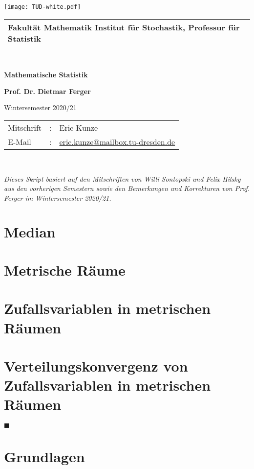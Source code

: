 \documentclass[ngerman, a4paper, 11pt]{report}
\makeatletter
\newcommand{\makeTUtitle}[1][]{%
    \begin{titlepage}
        \pagecolor{cddarkblue!90}
        \color{white}

        \raggedright
        \fosfamily
        \setlength{\parindent}{0pt}

        \hspace{-18.6mm} %
        \texttt{[image: TUD-white.pdf]} \\

        \vspace{3mm}
        \begin{tabular}{m{\textwidth}}
            \hline
            \hspace{-4pt}\small{\textbf{Fakultät Mathematik} Institut für Stochastik, Professur für Statistik} \\
            \hline
        \end{tabular} \\

        \vspace{5cm}
        {\Huge\bfseries \MakeUppercase Mathematische Statistik \par}
        \ifthenelse{\isempty{#1}}{}{
            \vspace{0.5cm}%
            {\Large \itshape #1} \\%
        }
        \vspace{1.5cm}
        \textbf{{\Large Prof. Dr. Dietmar Ferger}} \par
        \vspace{0.5cm}
        {\large Wintersemester 2020/21}

        \vfill
        \begin{tabular}{lll}
            Mitschrift  & : & Eric Kunze \\
            E-Mail      & : & \url{eric.kunze@mailbox.tu-dresden.de} \\
        \end{tabular}
    \end{titlepage}
    \nopagecolor
}
\theoremstyle{plain}
\theoremstyle{plain}
\theoremstyle{plain}
\theoremstyle{nonumberplain}
\theoremstyle{proofstyle}
\makeatother
\begin{document}
    \makeTUtitle
    
    ~ \vfill
    \begin{center}
    	\fosfamily \itshape
    	Dieses Skript basiert auf den Mitschriften von Willi Sontopski und Felix Hilsky aus den vorherigen Semestern sowie den Bemerkungen und Korrekturen von Prof. Ferger im Wintersemester 2020/21. 
    \end{center}
	\vfill
	
	\pagebreak

    \tableofcontents

    \chapter{Median}
    \label{chapter_1_median}
    
    
    
    \chapter{Metrische Räume}
    \label{chapter_2_metrischeRaeume}
    

	\chapter{Zufallsvariablen in metrischen Räumen}
	\label{chapter_3_zufallsvariablenInMetrischenRaeumen}
	
	
	
	
	
	
	\chapter{Verteilungskonvergenz von Zufallsvariablen in metrischen Räumen}
	
	
    \vfill \hfill $\blacksquare$
    
    \appendix
    \chapter{Grundlagen}
    
    
    \nocite{*} %
   	
    
\end{document}
